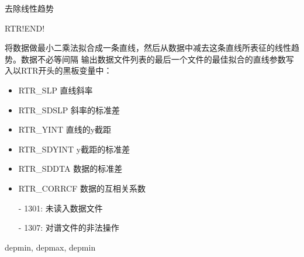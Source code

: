 \label{cmd:rtrend}

去除线性趋势

\begin{SACSTX}
RTR!END!
\end{SACSTX}

将数据做最小二乘法拟合成一条直线，然后从数据中减去这条直线所表征的线性趋势。数据不必等间隔
输出数据文件列表的最后一个文件的最佳拟合的直线参数写入以RTR开头的黑板变量中：
\begin{itemize}
\item RTR\_SLP 直线斜率
\item RTR\_SDSLP 斜率的标准差
\item RTR\_YINT 直线的y截距
\item RTR\_SDYINT y截距的标准差
\item RTR\_SDDTA 数据的标准差
\item RTR\_CORRCF 数据的互相关系数
\end{itemize}

\begin{itemize}
\item[-]1301: 未读入数据文件
\item[-]1307: 对谱文件的非法操作
\end{itemize}

depmin, depmax, depmin
